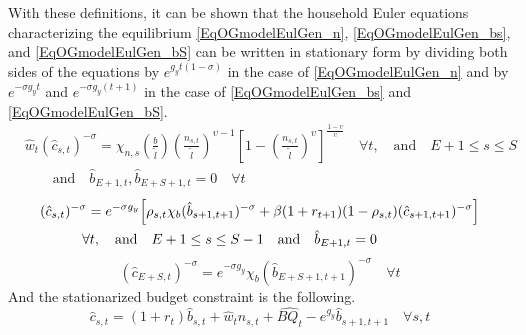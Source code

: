 \documentclass[letterpaper,12pt]{article}
\theoremstyle{definition}
\begin{document}
    With these definitions, it can be shown that the household Euler equations  characterizing the equilibrium \eqref{EqOGmodelEulGen_n}, \eqref{EqOGmodelEulGen_bs}, and \eqref{EqOGmodelEulGen_bS} can be written in stationary form by dividing both sides of the equations by $e^{g_y t(1-\sigma)}$ in the case of \eqref{EqOGmodelEulGen_n} and by $e^{-\sigma g_y t}$ and $e^{-\sigma g_y(t+1)}$ in the case of \eqref{EqOGmodelEulGen_bs} and \eqref{EqOGmodelEulGen_bS}.
    \begin{equation}\label{EqOGmodelEulStat_n}
      \begin{split}
        &\hat{w}_t\left(\hat{c}_{s,t}\right)^{-\sigma} = \chi_{n,s}\left(\frac{b}{\tilde{l}}\right)\left(\frac{n_{s,t}}{\tilde{l}}\right)^{\upsilon - 1}\left[1 - \left(\frac{n_{s,t}}{\tilde{l}}\right)^\upsilon\right]^\frac{1-\upsilon}{\upsilon} \quad\forall t,\quad\text{and}\quad E+1\leq s\leq S \\
        &\qquad\text{and}\quad \hat{b}_{E+1,t},\hat{b}_{E+S+1,t} = 0 \quad\forall t
      \end{split}
    \end{equation}
    \begin{equation}\label{EqOGmodelEulStat_bs}
      \begin{split}
        &(\hat{c}_{s,t})^{-\sigma} = e^{-\sigma g_y}\Bigl[\rho_{s,t}\chi_b(\hat{b}_{s+1,t+1})^{-\sigma} + \beta(1+r_{t+1})(1 - \rho_{s,t})(\hat{c}_{s+1,t+1})^{-\sigma}\Bigr] \\
        &\qquad\quad\forall t,\quad\text{and}\quad E+1\leq s\leq S-1\quad\text{and}\quad \hat{b}_{E+1,t} = 0
      \end{split}
    \end{equation}
    \begin{equation}\label{EqOGmodelEulStat_bS}
      (\hat{c}_{E+S,t})^{-\sigma} = e^{-\sigma g_y}\chi_b(\hat{b}_{E+S+1,t+1})^{-\sigma}\quad\forall t
    \end{equation}
    And the stationarized budget constraint is the following.
    \begin{equation}\label{EqOGmodelBCstat}
      \hat{c}_{s,t} = (1 + r_{t})\hat{b}_{s,t} + \hat{w}_t n_{s,t} + \hat{BQ_t} - e^{g_y}\hat{b}_{s+1,t+1} \quad\forall s,t
    \end{equation}
\end{document}
